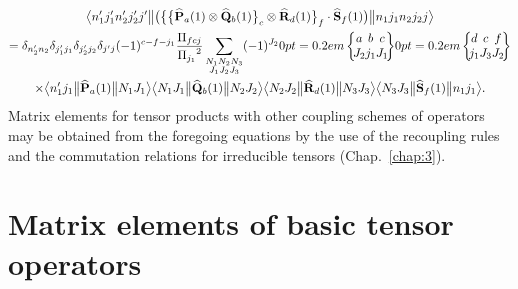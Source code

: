 \begin{multline*}
\braOketred{ n_{1}^{\prime} j_{1}^{\prime} n_{2}^{\prime} j_{2}^{\prime} j^{\prime}}{\bigl(\bigl\{\bigl\{\widehat{\vect{P}}_{a}(1) \otimes \widehat{\vect{Q}}_{b}(1)\bigr\}_{c} \otimes \widehat{\vect{R}}_{d}(1)\bigr\}_{f} \cdot \widehat{\vect{S}}_{f}(1)\bigr)}{n_{1} j_{1} n_{2} j_{2} j}\\
=\delta_{n_{2}^{\prime} n_{2}} \delta_{j_{1}^{\prime} j_{1}} \delta_{j_{2}^{\prime} j_{2}} \delta_{j^{\prime} j}(-1)^{c-f-j_{1}} \frac{\Fact{f c j}}{\Fact{j_{1}}^{2}} \sum_{\substack{N_{1} N_{2} N_{3} \\
J_{1} J_{2} J_{3}}}(-1)^{J_{2}}
\sixj{a}{b}{c}{J_{2}}{j_{1}}{J_{1}}
\sixj{d}{c}{f}{j_{1}}{J_{3}}{J_{2}} \\
\times
\braOketred{ n_{1}^{\prime} j_{1}}{\widehat{\vect{P}}_{a}(1)}{ N_{1} J_{1}}
\braOketred{ N_{1} J_{1}}{\widehat{\vect{Q}}_{b}(1)}{ N_{2} J_{2}}
\braOketred{ N_{2} J_{2}}{\widehat{\vect{R}}_{d}(1)}{ N_{3} J_{3}}
\braOketred{ N_{3} J_{3}}{\widehat{\vect{S}}_{f}(1)}{ n_{1} j_{1}}.
\end{multline*}
Matrix elements for tensor products with other coupling schemes of operators may be obtained from the foregoing equations by the use of the recoupling rules and the commutation relations for irreducible tensors (Chap.~\ref{chap:3}).

\section{Matrix elements of basic tensor operators}\label{sec:13.2}
